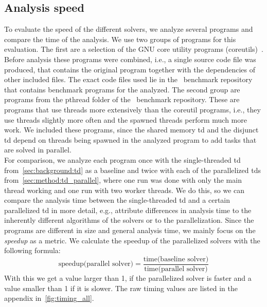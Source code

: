   \subsection{Analysis speed}
  \label{sec:eval:speed}
  To evaluate the speed of the different solvers, we analyze several programs and compare the time of the analysis. We use two groups of programs for this evaluation. The first are a selection of the GNU core utility programs (coreutils)~\cite{gnuCoreutils}. Before analysis these programs were combined, i.e., a single source code file was produced, that contains the original program together with the dependencies of other included files. The exact code files used lie in the \gob\ benchmark repository~\cite{goblintBench} that contains benchmark programs for the analyzed.
  The second group are programs from the pthread folder of the \gob\ benchmark repository. These are programs that use threads more extensively than the coreutil programs, i.e., they use threads slightly more often and the spawned threads perform much more work. We included these programs, since the shared memory \ac{td} and the disjunct \ac{td} depend on threads being spawned in the analyzed program to add tasks that are solved in parallel.\\
  For comparison, we analyze each program once with the single-threaded \ac{td} from~\autoref{sec:background:td} as a baseline and twice with each of the parallelized \acp{td} from~\autoref{sec:method:td_parallel}, where one run was done with only the main thread working and one run with two worker threads. We do this, so we can compare the analysis time between the single-threaded \ac{td} and a certain parallelized \ac{td} in more detail, e.g., attribute differences in analysis time to the inherently different algorithms of the solvers or to the parallelization. Since the programs are different in size and general analysis time, we mainly focus on the \textit{speedup} as a metric. We calculate the speedup of the parallelized solvers with the following formula:
  \begin{equation*}
    \text{speedup(parallel solver)} = \frac{\text{time(baseline solver)}}{\text{time(parallel solver)}}
  \end{equation*}
  With this we get a value larger than 1, if the parallelized solver is faster and a value smaller than 1 if it is slower. The raw timing values are listed in the appendix in~\autoref{fig:timing_all}.

